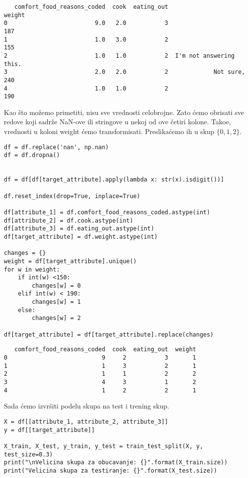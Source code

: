 \documentclass[12pt,a4paper]{article}
\begin{document}
\begin{verbatim}
   comfort_food_reasons_coded  cook  eating_out                    weight
0                         9.0   2.0           3                       187
1                         1.0   3.0           2                       155
2                         1.0   1.0           2  I'm not answering this.
3                         2.0   2.0           2             Not sure, 240
4                         1.0   1.0           2                       190
\end{verbatim}

Kao \v sto mo\v zemo primetiti, nisu sve vrednosti celobrojne. Zato \' cemo obrisati sve redove koji sadr\v ze NaN-ove ili stringove u nekoj od ove \v cetiri kolone. Tako\dj e, vrednosti u koloni weight \' cemo transformisati. Preslika\' cemo ih u skup $\{0, 1, 2\}$.


\begin{lstlisting}[mathescape=true]
df = df.replace('nan', np.nan)
df = df.dropna()


df = df[df[target_attribute].apply(lambda x: str(x).isdigit())]

df.reset_index(drop=True, inplace=True)

df[attribute_1] = df.comfort_food_reasons_coded.astype(int)
df[attribute_2] = df.cook.astype(int)
df[attribute_3] = df.eating_out.astype(int)
df[target_attribute] = df.weight.astype(int)

changes = {}
weight = df[target_attribute].unique()
for w in weight:
    if int(w) <150:
        changes[w] = 0
    elif int(w) < 190:
        changes[w] = 1
    else:
        changes[w] = 2

df[target_attribute] = df[target_attribute].replace(changes)
\end{lstlisting}

\begin{verbatim}
   comfort_food_reasons_coded  cook  eating_out  weight
0                           9     2           3       1
1                           1     3           2       1
2                           1     1           2       2
3                           4     3           1       2
4                           1     2           2       1
\end{verbatim}

Sada \' cemo izvr\v siti podelu skupa na test i trening skup.

\begin{lstlisting}
X = df[[attribute_1, attribute_2, attribute_3]]
y = df[[target_attribute]]

X_train, X_test, y_train, y_test = train_test_split(X, y, test_size=0.3)
print("\nVelicina skupa za obucavanje: {}".format(X_train.size))
print("Velicina skupa za testiranje: {}".format(X_test.size))
\end{lstlisting}
\end{document}
